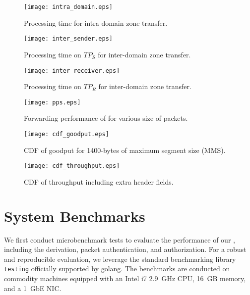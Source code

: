 \begin{figure}
	\begin{minipage}{.47\linewidth}
		\centering
		\texttt{[image: intra\_domain.eps]}
		\caption{Processing time for intra-domain zone transfer.}
		\label{fig:intra}
	\end{minipage}\hspace{1em}
	\begin{minipage}{.47\linewidth}
		\centering
		\texttt{[image: inter\_sender.eps]}
		\caption{Processing time on $TP_S$ for inter-domain zone transfer.}
		\label{fig:inter_sender}
	\end{minipage}\vspace{2em}
	\begin{minipage}{.47\linewidth}
		\centering
		\texttt{[image: inter\_receiver.eps]}
		\caption{Processing time on $TP_R$ for inter-domain zone transfer.}
		\label{fig:inter_receiver}
	\end{minipage}\hspace{1em}
	\begin{minipage}{.47\linewidth}
		\centering
		\texttt{[image: pps.eps]}
		\caption{Forwarding performance of \tp for various size of packets.}
		\label{fig:forwarding}
	\end{minipage}\vspace{2em}
	\begin{minipage}{.47\linewidth}
		\centering
		\texttt{[image: cdf\_goodput.eps]}
		\caption{CDF of goodput for 1400-bytes of maximum segment size (MMS).}
		\label{fig:goodput}
	\end{minipage}\hspace{1em}
	\begin{minipage}{.47\linewidth}
		\centering
		\texttt{[image: cdf\_throughput.eps]}
		\caption{CDF of throughput including extra header fields.}
		\label{fig:throughput}
	\end{minipage}
\end{figure}

\section{System Benchmarks}
\label{sec:systembenchmark}

We first conduct microbenchmark tests to evaluate the performance of our \tp, including the
derivation, packet authentication, and authorization. For a robust and reproducible evaluation,
we leverage the standard benchmarking library \texttt{testing} officially supported by golang.
The benchmarks are conducted on commodity machines equipped with an Intel i7 \SI{2.9}{GHz}
CPU, \SI{16}{GB} memory, and a \SI{1}{GbE} NIC.

